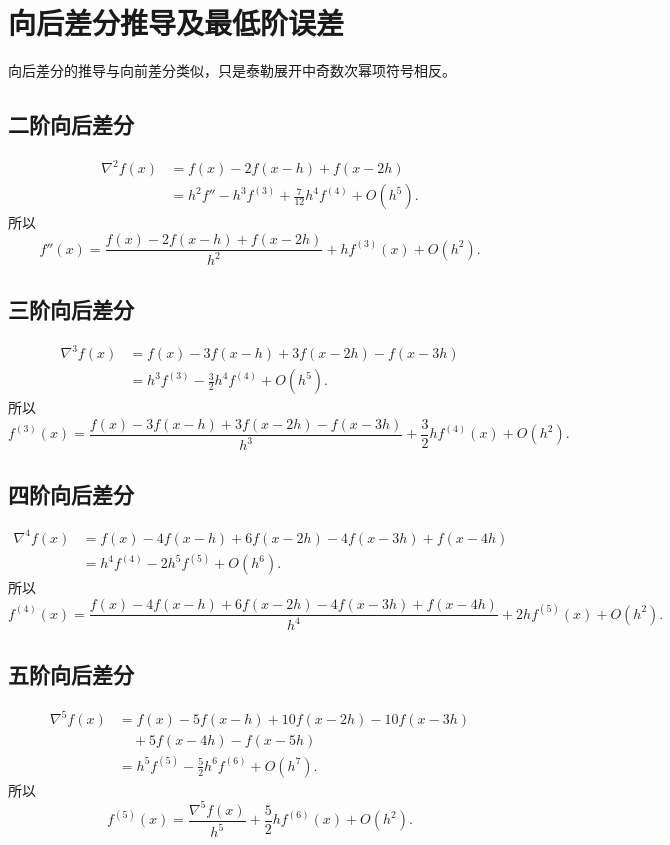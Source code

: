 \documentclass[12pt,a4paper]{ctexart}
\begin{document}
\section{向后差分推导及最低阶误差}
向后差分的推导与向前差分类似，只是泰勒展开中奇数次幂项符号相反。

\subsection{二阶向后差分}
\[
\begin{aligned}
\nabla^2 f(x)
&=f(x)-2f(x-h)+f(x-2h)\\
&=h^2f''-h^3f^{(3)}+\frac7{12}h^4f^{(4)}+O(h^5).
\end{aligned}
\]
所以
\[
  \boxed{f''(x)=\frac{f(x)-2f(x-h)+f(x-2h)}{h^2}+h f^{(3)}(x)+O(h^2).}
\]

\subsection{三阶向后差分}
\[
\begin{aligned}
\nabla^3 f(x)
&=f(x)-3f(x-h)+3f(x-2h)-f(x-3h)\\
&=h^3f^{(3)}-\frac32h^4f^{(4)}+O(h^5).
\end{aligned}
\]
所以
\[
  \boxed{f^{(3)}(x)=\frac{f(x)-3f(x-h)+3f(x-2h)-f(x-3h)}{h^3}+\frac32h f^{(4)}(x)+O(h^2).}
\]

\subsection{四阶向后差分}
\[
\begin{aligned}
\nabla^4 f(x)
&=f(x)-4f(x-h)+6f(x-2h)-4f(x-3h)+f(x-4h)\\
&=h^4f^{(4)}-2h^5f^{(5)}+O(h^6).
\end{aligned}
\]
所以
\[
  \boxed{f^{(4)}(x)=\frac{f(x)-4f(x-h)+6f(x-2h)-4f(x-3h)+f(x-4h)}{h^4}+2h f^{(5)}(x)+O(h^2).}
\]

\subsection{五阶向后差分}
\[
\begin{aligned}
\nabla^5 f(x)
&=f(x)-5f(x-h)+10f(x-2h)-10f(x-3h)\\
&\quad +5f(x-4h)-f(x-5h)\\
&=h^5f^{(5)}-\frac52h^6f^{(6)}+O(h^7).
\end{aligned}
\]
所以
\[
  \boxed{f^{(5)}(x)=\frac{\nabla^5 f(x)}{h^5}+\frac52h f^{(6)}(x)+O(h^2).}
\]
\end{document}
